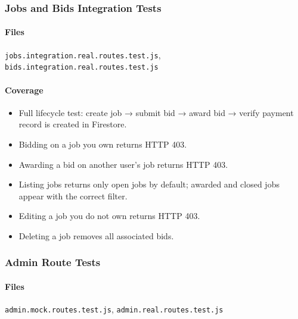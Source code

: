\documentclass[11pt]{article}
\begin{document}
\subsubsection{Jobs and Bids Integration Tests}

\paragraph{Files}
\texttt{jobs.integration.real.routes.test.js}, \texttt{bids.integration.real.routes.test.js}

\paragraph{Coverage}
\begin{itemize}[leftmargin=1.4em]
  \item Full lifecycle test: create job → submit bid → award bid → verify payment record is created in Firestore.
  \item Bidding on a job you own returns HTTP 403.
  \item Awarding a bid on another user's job returns HTTP 403.
  \item Listing jobs returns only open jobs by default; awarded and closed jobs appear with the correct filter.
  \item Editing a job you do not own returns HTTP 403.
  \item Deleting a job removes all associated bids.
\end{itemize}

\subsubsection{Admin Route Tests}

\paragraph{Files}
\texttt{admin.mock.routes.test.js}, \texttt{admin.real.routes.test.js}
\end{document}
